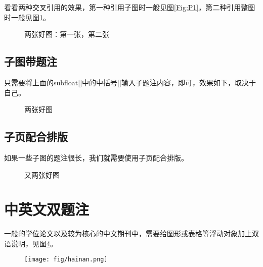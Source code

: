 \documentclass[12pt,a4paper]{article}
\begin{document}
看看两种交叉引用的效果，第一种引用子图时一般见图\ref{Fig:P1}，第二种引用整图时一般见图\ref{Fig:P12}。

\begin{figure}[!htbp]
	\centering
    \quad
    
    \caption{两张好图：\protect{}第一张，\protect{}第二张}%
    \label{Fig:P12}
\end{figure}

\subsection{子图带题注}

只需要将上面的subfloat[]{}中的中括号[]输入子题注内容，即可，效果如下，取决于自己。
\begin{figure}[!htbp]
	\centering
    \quad
    
    \caption{两张好图}
    \label{Fig:F12}
\end{figure}

\subsection{子页配合排版}

如果一些子图的题注很长，我们就需要使用子页配合排版。

\begin{figure}[!htbp]
	\centering
    \quad
    \caption{又两张好图}
    \label{Fig:FG34}
\end{figure}

\section{中英文双题注}

一般的学位论文以及较为核心的中文期刊中，需要给图形或表格等浮动对象加上双语说明，见图\ref{a good figure with two caption}。
\begin{figure}[!htbp]
  \centering 
  \texttt{[image: fig/hainan.png]}
  \label{a good figure with two caption}%
\end{figure}


\listoffigures
\end{document}
